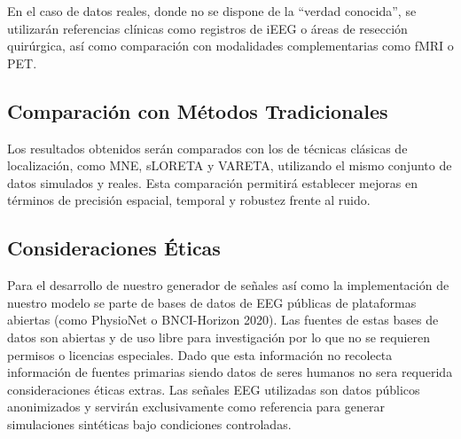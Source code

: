    En el caso de datos reales, donde no se dispone de la “verdad conocida”, se utilizarán referencias clínicas como registros de iEEG o áreas de resección quirúrgica, así como comparación con modalidades complementarias como fMRI o PET.
    
    \subsection{Comparación con Métodos Tradicionales}
    
    Los resultados obtenidos serán comparados con los de técnicas clásicas de localización, como MNE, sLORETA y VARETA, utilizando el mismo conjunto de datos simulados y reales. Esta comparación permitirá establecer mejoras en términos de precisión espacial, temporal y robustez frente al ruido.


\subsection{Consideraciones Éticas}

Para el desarrollo de nuestro generador de señales así como la implementación de nuestro modelo se parte de bases de datos de EEG públicas de plataformas abiertas (como PhysioNet\cite{physionet2021auditoryeeg} o BNCI-Horizon 2020\cite{bnci2020datasets}). Las fuentes de estas bases de datos son abiertas y de uso libre para investigación por lo que no se requieren permisos o licencias especiales. Dado que esta información no recolecta información de fuentes primarias siendo datos de seres humanos no sera requerida consideraciones éticas extras. Las señales EEG utilizadas son datos públicos anonimizados y servirán exclusivamente como referencia para generar simulaciones sintéticas bajo condiciones controladas.
